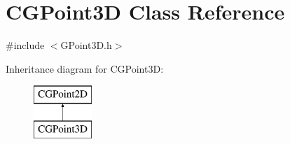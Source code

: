 \hypertarget{class_c_g_point3_d}{}\section{C\+G\+Point3\+D Class Reference}
\label{class_c_g_point3_d}


{\ttfamily \#include $<$G\+Point3\+D.\+h$>$}

Inheritance diagram for C\+G\+Point3\+D\+:\begin{figure}[H]
\begin{center}
\leavevmode
\includegraphics[height=2.000000cm]{class_c_g_point3_d}
\end{center}
\end{figure}
